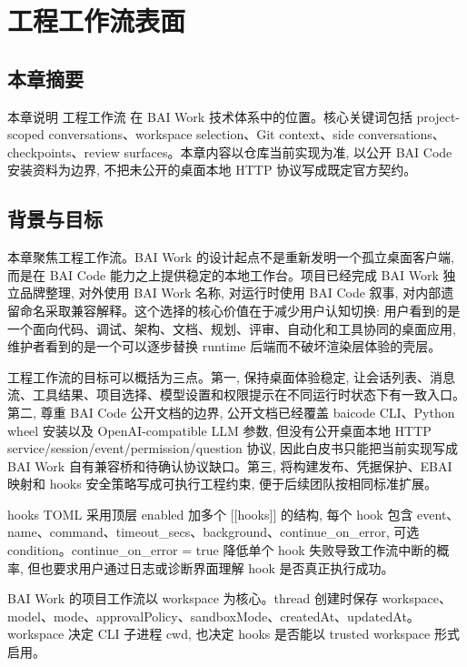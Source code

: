 \chapter{工程工作流表面}
\section{本章摘要}
本章说明 工程工作流 在 BAI Work 技术体系中的位置。核心关键词包括 project-scoped conversations、workspace selection、Git context、side conversations、checkpoints、review surfaces。本章内容以仓库当前实现为准, 以公开 BAI Code 安装资料为边界, 不把未公开的桌面本地 HTTP 协议写成既定官方契约。

\section{背景与目标}
本章聚焦工程工作流。BAI Work 的设计起点不是重新发明一个孤立桌面客户端, 而是在 BAI Code 能力之上提供稳定的本地工作台。项目已经完成 BAI Work 独立品牌整理, 对外使用 BAI Work 名称, 对运行时使用 BAI Code 叙事, 对内部遗留命名采取兼容解释。这个选择的核心价值在于减少用户认知切换: 用户看到的是一个面向代码、调试、架构、文档、规划、评审、自动化和工具协同的桌面应用, 维护者看到的是一个可以逐步替换 runtime 后端而不破坏渲染层体验的壳层。

工程工作流的目标可以概括为三点。第一, 保持桌面体验稳定, 让会话列表、消息流、工具结果、项目选择、模型设置和权限提示在不同运行时状态下有一致入口。第二, 尊重 BAI Code 公开文档的边界, 公开文档已经覆盖 baicode CLI、Python wheel 安装以及 OpenAI-compatible LLM 参数, 但没有公开桌面本地 HTTP service/session/event/permission/question 协议, 因此白皮书只能把当前实现写成 BAI Work 自有兼容桥和待确认协议缺口。第三, 将构建发布、凭据保护、EBAI 映射和 hooks 安全策略写成可执行工程约束, 便于后续团队按相同标准扩展。

hooks TOML 采用顶层 enabled 加多个 [[hooks]] 的结构, 每个 hook 包含 event、name、command、timeout\_secs、background、continue\_on\_error, 可选 condition。continue\_on\_error = true 降低单个 hook 失败导致工作流中断的概率, 但也要求用户通过日志或诊断界面理解 hook 是否真正执行成功。

BAI Work 的项目工作流以 workspace 为核心。thread 创建时保存 workspace、model、mode、approvalPolicy、sandboxMode、createdAt、updatedAt。workspace 决定 CLI 子进程 cwd, 也决定 hooks 是否能以 trusted workspace 形式启用。

